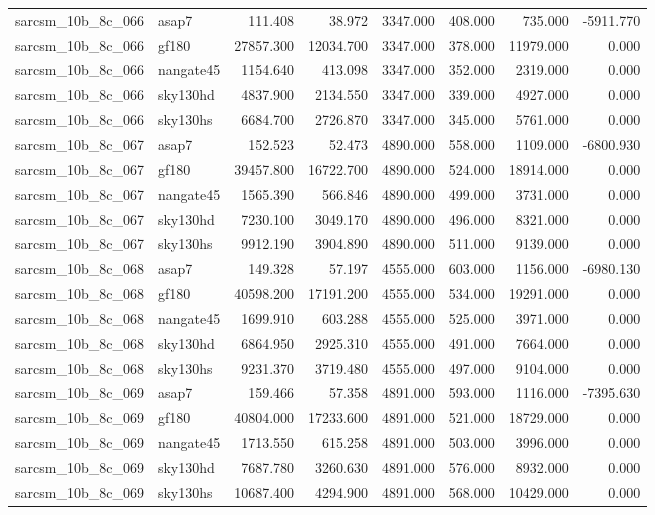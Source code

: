 \begin{tabular}{llrrrrrr}
sarcsm\_10b\_8c\_066 & asap7 & 111.408 & 38.972 & 3347.000 & 408.000 & 735.000 & -5911.770 \\
sarcsm\_10b\_8c\_066 & gf180 & 27857.300 & 12034.700 & 3347.000 & 378.000 & 11979.000 & 0.000 \\
sarcsm\_10b\_8c\_066 & nangate45 & 1154.640 & 413.098 & 3347.000 & 352.000 & 2319.000 & 0.000 \\
sarcsm\_10b\_8c\_066 & sky130hd & 4837.900 & 2134.550 & 3347.000 & 339.000 & 4927.000 & 0.000 \\
sarcsm\_10b\_8c\_066 & sky130hs & 6684.700 & 2726.870 & 3347.000 & 345.000 & 5761.000 & 0.000 \\
sarcsm\_10b\_8c\_067 & asap7 & 152.523 & 52.473 & 4890.000 & 558.000 & 1109.000 & -6800.930 \\
sarcsm\_10b\_8c\_067 & gf180 & 39457.800 & 16722.700 & 4890.000 & 524.000 & 18914.000 & 0.000 \\
sarcsm\_10b\_8c\_067 & nangate45 & 1565.390 & 566.846 & 4890.000 & 499.000 & 3731.000 & 0.000 \\
sarcsm\_10b\_8c\_067 & sky130hd & 7230.100 & 3049.170 & 4890.000 & 496.000 & 8321.000 & 0.000 \\
sarcsm\_10b\_8c\_067 & sky130hs & 9912.190 & 3904.890 & 4890.000 & 511.000 & 9139.000 & 0.000 \\
sarcsm\_10b\_8c\_068 & asap7 & 149.328 & 57.197 & 4555.000 & 603.000 & 1156.000 & -6980.130 \\
sarcsm\_10b\_8c\_068 & gf180 & 40598.200 & 17191.200 & 4555.000 & 534.000 & 19291.000 & 0.000 \\
sarcsm\_10b\_8c\_068 & nangate45 & 1699.910 & 603.288 & 4555.000 & 525.000 & 3971.000 & 0.000 \\
sarcsm\_10b\_8c\_068 & sky130hd & 6864.950 & 2925.310 & 4555.000 & 491.000 & 7664.000 & 0.000 \\
sarcsm\_10b\_8c\_068 & sky130hs & 9231.370 & 3719.480 & 4555.000 & 497.000 & 9104.000 & 0.000 \\
sarcsm\_10b\_8c\_069 & asap7 & 159.466 & 57.358 & 4891.000 & 593.000 & 1116.000 & -7395.630 \\
sarcsm\_10b\_8c\_069 & gf180 & 40804.000 & 17233.600 & 4891.000 & 521.000 & 18729.000 & 0.000 \\
sarcsm\_10b\_8c\_069 & nangate45 & 1713.550 & 615.258 & 4891.000 & 503.000 & 3996.000 & 0.000 \\
sarcsm\_10b\_8c\_069 & sky130hd & 7687.780 & 3260.630 & 4891.000 & 576.000 & 8932.000 & 0.000 \\
sarcsm\_10b\_8c\_069 & sky130hs & 10687.400 & 4294.900 & 4891.000 & 568.000 & 10429.000 & 0.000 \\

\end{tabular}
